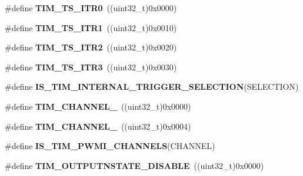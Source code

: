 \begin{DoxyCompactItemize}
\item 
\#define {\bfseries T\+I\+M\+\_\+\+T\+S\+\_\+\+I\+T\+R0}~((uint32\+\_\+t)0x0000)\hypertarget{group___h_a_l___t_i_m___aliased___macros_gab7cf2b7db3956d4fd1e5a5d84f4891e7}{}\label{group___h_a_l___t_i_m___aliased___macros_gab7cf2b7db3956d4fd1e5a5d84f4891e7}

\item 
\#define {\bfseries T\+I\+M\+\_\+\+T\+S\+\_\+\+I\+T\+R1}~((uint32\+\_\+t)0x0010)\hypertarget{group___h_a_l___t_i_m___aliased___macros_gad90fbca297153ca9c0112a67ea2c6cb3}{}\label{group___h_a_l___t_i_m___aliased___macros_gad90fbca297153ca9c0112a67ea2c6cb3}

\item 
\#define {\bfseries T\+I\+M\+\_\+\+T\+S\+\_\+\+I\+T\+R2}~((uint32\+\_\+t)0x0020)\hypertarget{group___h_a_l___t_i_m___aliased___macros_ga8599ba58a5f911d648503c7ac55d4320}{}\label{group___h_a_l___t_i_m___aliased___macros_ga8599ba58a5f911d648503c7ac55d4320}

\item 
\#define {\bfseries T\+I\+M\+\_\+\+T\+S\+\_\+\+I\+T\+R3}~((uint32\+\_\+t)0x0030)\hypertarget{group___h_a_l___t_i_m___aliased___macros_ga63183e611b91c5847040172c0069514d}{}\label{group___h_a_l___t_i_m___aliased___macros_ga63183e611b91c5847040172c0069514d}

\item 
\#define {\bfseries I\+S\+\_\+\+T\+I\+M\+\_\+\+I\+N\+T\+E\+R\+N\+A\+L\+\_\+\+T\+R\+I\+G\+G\+E\+R\+\_\+\+S\+E\+L\+E\+C\+T\+I\+ON}(S\+E\+L\+E\+C\+T\+I\+ON)
\item 
\#define {\bfseries T\+I\+M\+\_\+\+C\+H\+A\+N\+N\+E\+L\+\_}~((uint32\+\_\+t)0x0000)\hypertarget{group___h_a_l___t_i_m___aliased___macros_ga6b1541e4a49d62610899e24bf23f4879}{}\label{group___h_a_l___t_i_m___aliased___macros_ga6b1541e4a49d62610899e24bf23f4879}

\item 
\#define {\bfseries T\+I\+M\+\_\+\+C\+H\+A\+N\+N\+E\+L\+\_}~((uint32\+\_\+t)0x0004)\hypertarget{group___h_a_l___t_i_m___aliased___macros_ga33e02d43345a7ac5886f01b39e4f7ccd}{}\label{group___h_a_l___t_i_m___aliased___macros_ga33e02d43345a7ac5886f01b39e4f7ccd}

\item 
\#define {\bfseries I\+S\+\_\+\+T\+I\+M\+\_\+\+P\+W\+M\+I\+\_\+\+C\+H\+A\+N\+N\+E\+LS}(C\+H\+A\+N\+N\+EL)
\item 
\#define {\bfseries T\+I\+M\+\_\+\+O\+U\+T\+P\+U\+T\+N\+S\+T\+A\+T\+E\+\_\+\+D\+I\+S\+A\+B\+LE}~((uint32\+\_\+t)0x0000)\hypertarget{group___h_a_l___t_i_m___aliased___macros_ga07bb7288fc4ed155301a3276908a23a0}{}\label{group___h_a_l___t_i_m___aliased___macros_ga07bb7288fc4ed155301a3276908a23a0}


\end{DoxyCompactItemize}
